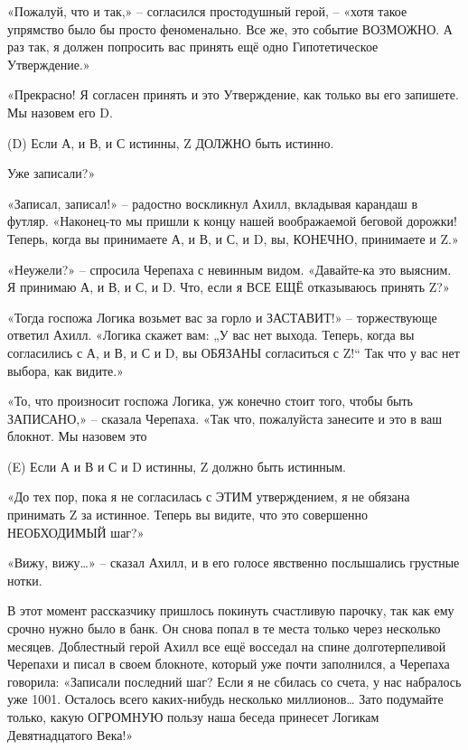 \documentclass[../main.tex]{subfiles}
\begin{document}
\begin{Dialogue}
«Пожалуй, что и так,» \--- согласился простодушный герой, \--- «хотя такое упрямство было бы просто феноменально. Все же, это событие ВОЗМОЖНО\@. А раз так, я должен попросить вас принять ещё одно Гипотетическое Утверждение.»

«Прекрасно! Я согласен принять и это Утверждение, как только вы его запишете. Мы назовем его D.

\begin{statements}
    \item[(D)] Если А, и В, и С истинны, Z ДОЛЖНО быть истинно.
\end{statements}

Уже записали?»

«Записал, записал!» \--- радостно воскликнул Ахилл, вкладывая карандаш в футляр. «Наконец-то мы пришли к концу нашей воображаемой беговой дорожки! Теперь, когда вы принимаете А, и В, и С, и D, вы, КОНЕЧНО, принимаете и Z.»

«Неужели?» \--- спросила Черепаха с невинным видом. «Давайте-ка это выясним. Я принимаю А, и В, и С, и D. Что, если я ВСЕ ЕЩЁ отказываюсь принять Z?»

«Тогда госпожа Логика возьмет вас за горло и ЗАСТАВИТ!» \--- торжествующе ответил Ахилл. «Логика скажет вам: „У вас нет выхода. Теперь, когда вы согласились с А, и В, и С и D, вы ОБЯЗАНЫ согласиться с Z!{}`` Так что у вас нет выбора, как видите.»

«То, что произносит госпожа Логика, уж конечно стоит того, чтобы быть ЗАПИСАНО,» \--- сказала Черепаха. «Так что, пожалуйста занесите и это в ваш блокнот. Мы назовем это

\begin{statements}
    \item[(E)] Если А и В и С и D истинны, Z должно быть истинным.
\end{statements}

«До тех пор, пока я не согласилась с ЭТИМ утверждением, я не обязана принимать Z за истинное. Теперь вы видите, что это совершенно НЕОБХОДИМЫЙ шаг?»

«Вижу, вижу\ldots» \--- сказал Ахилл, и в его голосе явственно послышались грустные нотки.

В этот момент рассказчику пришлось покинуть счастливую парочку, так как ему срочно нужно было в банк. Он снова попал в те места только через несколько месяцев. Доблестный герой Ахилл все ещё восседал на спине долготерпеливой Черепахи и писал в своем блокноте, который уже почти заполнился, а Черепаха говорила: «Записали последний шаг? Если я не сбилась со счета, у нас набралось уже 1001. Осталось всего каких-нибудь несколько миллионов\ldots{} Зато подумайте только, какую ОГРОМНУЮ пользу наша беседа принесет Логикам Девятнадцатого Века!»


\end{Dialogue}
\end{document}
